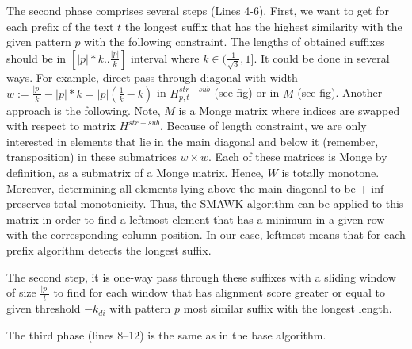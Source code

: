 The second phase comprises several steps (Lines 4-6).
First, we want to get for each prefix of the text $t$ the longest suffix that has the highest similarity with the given pattern $p$ with the following constraint.
The lengths of obtained suffixes should be in $[|p|*k..\frac{|p|}{k}]$ interval where $k \in (\frac{1}{\sqrt{3}},1]$.
It could be done in several ways.
For example, direct pass through diagonal with width $w:= \frac{|p|}{k} - |p|*k = |p|(\frac{1}{k} - k)$ in $H^{str-sub}_{p,t}$ (see fig) or in $M$ (see fig).
Another approach is the following.
Note, $M$ is a Monge matrix where indices are swapped with respect to matrix $H^{str-sub}$.
Because of length constraint, we are only interested in elements that lie in the main diagonal and below it (remember, transposition) in these submatrices $w\times w$.
Each of these  matrices is Monge by definition, as a submatrix of a Monge matrix.
Hence, $W$ is totally monotone.
Moreover, determining all elements lying above the main diagonal to be $+\inf$ preserves total monotonicity.
Thus, the \textrm{SMAWK} algorithm\cite{.} can be applied to this matrix in order to find a leftmost element that has a minimum in a given row with the corresponding column position.
In our case, leftmost means that for each prefix algorithm detects the longest suffix.

The second step, it is one-way pass through these suffixes with a sliding window of size $\frac{|p|}{t}$ to find for each window that has alignment score greater or equal to given threshold $-k_{di}$ with pattern $p$ most similar suffix with the longest length. 

The third phase (lines 8--12) is the same as in the base algorithm.

